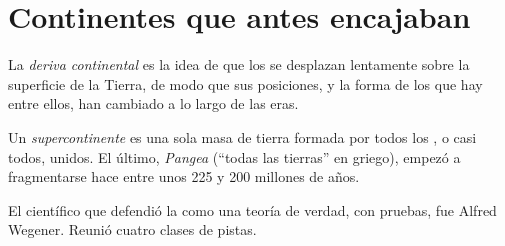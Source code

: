 \section{Continentes que antes encajaban}

\begin{definition}\label{def:g7:plate-tectonics:continental-drift}
La \emph{deriva continental} es la idea de que
los  se desplazan lentamente sobre la superficie de la Tierra,
de modo que sus posiciones, y la forma de los  que hay entre ellos,
han cambiado a lo largo de las eras.
\end{definition}

\begin{definition}[Supercontinente]\label{def:g7:plate-tectonics:supercontinent}
Un \emph{supercontinente} es una sola masa de tierra
formada por todos los , o casi todos, unidos. El último,
\emph{Pangea} (``todas las tierras'' en griego), empezó a
fragmentarse hace entre unos 225 y 200 millones de años.
\end{definition}

El científico que defendió la  como una teoría de
verdad, con pruebas, fue Alfred Wegener. Reunió cuatro clases de pistas.

